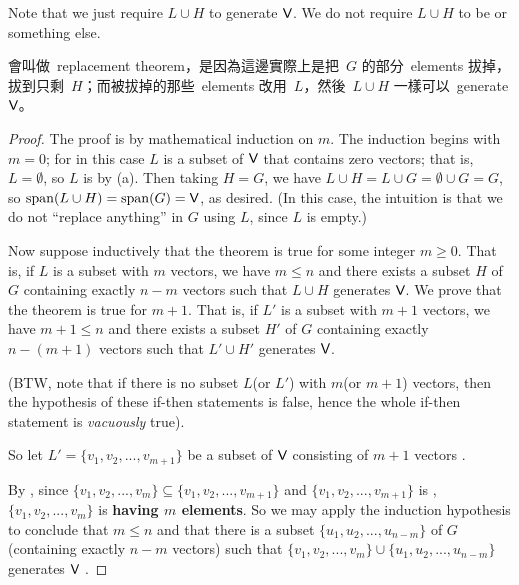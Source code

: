 \begin{note}
Note that we just require \(L \cup H\) to generate \(\textsf{V}\).
We do not require \(L \cup H\) to be \LID{} or something else.
\end{note}

\begin{note}
會叫做\ replacement theorem，是因為這邊實際上是把\ \(G\) 的部分\ elements 拔掉，拔到只剩\ \(H\)；而被拔掉的那些\ elements 改用\ \(L\)，然後\ \(L \cup H\) 一樣可以\ generate \(\textsf{V}\)。
\end{note}

\begin{proof}

The proof is by mathematical induction on \(m\).
The induction begins with \(m = 0\); for in this case \(L\) is a subset of \(\textsf{V}\) that contains zero vectors; that is, \(L = \emptyset\), so \(L\) is \LID{} by (a).
Then taking \(H = G\), we have \(L \cup H = L \cup G = \emptyset \cup G = G\), so \(\operatorname{span}(L \cup H) = \operatorname{span}(G) = \textsf{V}\), as desired.
(In this case, the intuition is that we do not ``replace anything'' in \(G\) using \(L\), since \(L\) is empty.)

Now suppose inductively that the theorem is true for some integer \(m \ge 0\).
That is, if \(L\) is a \LID{} subset with \(m\) vectors, we have \(m \le n\) and there exists a subset \(H\) of \(G\) containing exactly \(n - m\) vectors such that \(L \cup H\) generates \(\textsf{V}\).
We prove that the theorem is true for \(m + 1\).
That is, if \(L'\) is a \LID{} subset with \(m + 1\) vectors, we have \(m + 1 \le n\) and there exists a subset \(H'\) of \(G\) containing exactly \(n - (m + 1)\) vectors such that \(L' \cup H'\) generates \(\textsf{V}\).

(BTW, note that if there is no \LID{} subset \(L\)(or \(L'\)) with \(m\)(or \(m + 1\)) vectors, then the hypothesis of these if-then statements is false, hence the whole if-then statement is \emph{vacuously} true).

So let \(L' = \{ v_1, v_2, ..., v_{m + 1} \}\) be a \LID{} subset of \(\textsf{V}\) consisting of \(m + 1\) vectors \BLUE{(*)}.

By , since \(\{ v_1, v_2, ..., v_m \} \subseteq \{ v_1, v_2, ..., v_{m + 1} \}\) and \(\{ v_1, v_2, ..., v_{m + 1} \}\) is \LID{}, \(\{ v_1, v_2, ..., v_m \}\) is \LID{} \textbf{having \(m\) elements}.
So we may apply the induction hypothesis to conclude that \(m \le n\) and that there is a subset \(\{ u_1, u_2, ..., u_{n - m} \}\) of \(G\) (containing exactly \(n - m\) vectors) such that \(\{ v_1, v_2, ..., v_m \} \cup \{u_1, u_2, ..., u_{n - m} \}\) generates \(\textsf{V}\) .


\end{proof}
